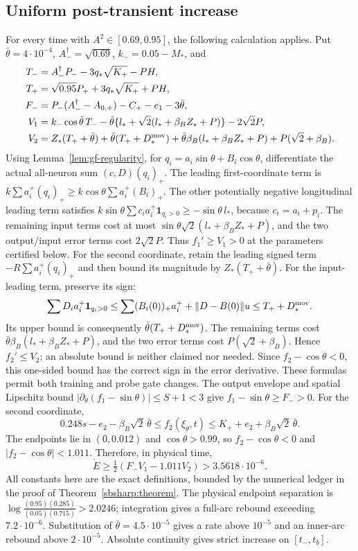 \documentclass[10pt]{article}
\theoremstyle{remark}\newtheorem{remark}[theorem]{Remark}
\begin{document}
\subsection{Uniform post-transient increase}\label{sec:late-increase}

For every time with
$A^2\in[0.69,0.95]$, the following calculation applies.
Put $\bar\theta=4\cdot10^{-4}$, $A_-^\dagger=\sqrt{0.69}$,
$k_-=0.05-M_*$, and
\begin{align*}
 T_-&=A_-^\dagger P_- -3q_*\sqrt{K_+}-PH,\\
 T_+&=\sqrt{0.95}P_++3q_*\sqrt{K_+}+PH,\\
 F_-&=P_-(A_-^\dagger-A_{0,+})-C_+-e_1-3\bar\theta,\\
 V_1&=k_-\cos\bar\theta\,T_-
   -\bar\theta\{l_*+\sqrt2(l_*+\beta_BZ_*+P)\}-2\sqrt2P,\\
 V_2&=Z_*(T_++\bar\theta)+\bar\theta(T_++D_*^{\rm mov})
   +\bar\theta\beta_B(l_*+\beta_BZ_*+P)+P(\sqrt2+\beta_B).
\end{align*}
Using Lemma~\ref{lem:gf-regularity}, for
$q_i=a_i\sin\theta+B_i\cos\theta$, differentiate the actual
all-neuron sum $(c,D)(q_i)_+$. The leading first-coordinate term is
$k\sum a_i^+(q_i)_+\ge k\cos\theta\sum a_i^+(B_i)_+$.
The other potentially negative longitudinal leading term satisfies
$k\sin\theta\sum c_i a_i^+\mathbf1_{q_i>0}\ge-\sin\theta\,l_*$,
because $c_i=a_i+p_i$. The remaining input terms cost at most
$\sin\theta\sqrt2(l_*+\beta_BZ_*+P)$, and the two output/input error
terms cost $2\sqrt2P$. Thus $f_1'\ge V_1>0$ at the parameters certified below.
For the second coordinate, retain the leading signed term
$-R\sum a_i^+(q_i)_+$ and then bound its magnitude by
$Z_*(T_++\bar\theta)$. For the input-leading term, preserve its sign:
\[
 \sum D_i a_i^+\mathbf1_{q_i>0}
 \le\sum (B_i(0))_+a_i^++\|D-B(0)\|u
 \le T_++D_*^{\rm mov}.
\]
Its upper bound is consequently $\bar\theta(T_++D_*^{\rm mov})$.
The remaining terms cost
$\bar\theta\beta_B(l_*+\beta_BZ_*+P)$, and the two error terms cost
$P(\sqrt2+\beta_B)$. Hence $f_2'\le V_2$; an absolute bound is neither
claimed nor needed. Since $f_2-\cos\theta<0$, this one-sided bound has
the correct sign in the error derivative.
These formulas permit both training and probe gate changes.
The output envelope and spatial Lipschitz bound
$|\partial_\theta(f_1-\sin\theta)|\le S+1<3$ give
$f_1-\sin\theta\ge F_->0$.
For the second coordinate,
\[
 0.248s-e_2-\beta_B\sqrt2\,\bar\theta
 \le f_2(\xi_\theta,t)
 \le K_++e_2+\beta_B\sqrt2\,\bar\theta.
\]
The endpoints lie in $(0,0.012)$ and $\cos\theta>0.99$, so
$f_2-\cos\theta<0$ and $|f_2-\cos\theta|<1.011$. Therefore, in physical time,
\[
 \dot E\ge\tfrac12(F_-V_1-1.011V_2)>3.5618\cdot10^{-6}.
\]
All constants here are the exact definitions, bounded by the numerical
ledger in the proof of Theorem~\ref{sbsharp:theorem}. The physical endpoint
separation is
$\log\frac{(0.95)(0.285)}{(0.05)(0.715)}>2.0246$; integration gives a
full-arc rebound exceeding $7.2\cdot10^{-6}$. Substitution of
$\bar\theta=4.5\cdot10^{-5}$ gives a rate above $10^{-5}$ and an
inner-arc rebound above $2\cdot10^{-5}$. Absolute continuity gives strict increase on $[t_-,t_b]$.
\end{document}
